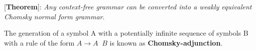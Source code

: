 \documentclass[11pt]{article}
\begin{document}
[\textbf{Theorem}]: \emph{Any context-free grammar can be converted into a weakly equivalent Chomsky normal form grammar}.

The generation of a symbol A with a potentially infinite sequence of symbols B with a rule of the form $A \rightarrow A\;\; B$ is known as \textbf{Chomsky-adjunction}.
\newpage


\end{document}
